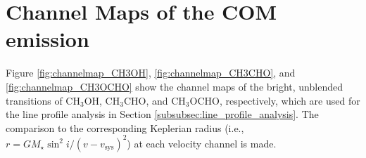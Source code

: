 \documentclass[twocolumn, twocolappendix, astrosymb, times]{aastex631}
\newcommand{\methanol}{CH$_3$OH\xspace}
\newcommand{\acetaldehyde}{CH$_3$CHO\xspace}
\newcommand{\methylformate}{CH$_3$OCHO\xspace}
\begin{document}
\vspace{5mm}





\appendix
\section{Channel Maps of the COM emission}\label{appendix:channel_maps}
Figure \ref{fig:channelmap_CH3OH}, \ref{fig:channelmap_CH3CHO}, and \ref{fig:channelmap_CH3OCHO} show the channel maps of the bright, unblended transitions of \methanol, \acetaldehyde, and \methylformate, respectively, which are used for the line profile analysis in Section \ref{subsubsec:line_profile_analysis}. The comparison to the corresponding Keplerian radius (i.e., $r = GM_\star\sin^2 i / (v - v_\mathrm{sys})^2$) at each velocity channel is made.

\begin{figure*}
\caption{Channel maps of the \methanol $2_{-1,1}$ -- $1_{-1,0}$ E $v_t=0$ transition. The black contours mark the [$-$3, 3, 5, 7, ...]$\,\times\,\sigma$ levels. The dashed contours indicate the negative values. The numbers in the upper-right and upper-left corners indicate the velocity of the channel and its corresponding Keplerian radius ($r = GM_\star\sin^2i/(v - v_\mathrm{sys})^2$), respectively. The red cross in each panel indicate the position of the disk center. The beam is shown in the lower-left corner of the lower-left panel.}
\label{fig:channelmap_CH3OH}
\end{figure*}
\end{document}
